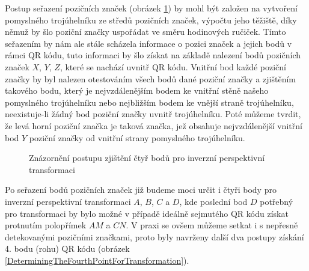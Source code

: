 Postup seřazení pozičních značek (obrázek \ref{QRCodeArea}) by mohl být založen
na vytvoření pomyslného trojúhelníku ze středů pozičních značek, výpočtu jeho těžiště, díky
němuž by šlo poziční značky uspořádat ve směru hodinových ručiček. Tímto
seřazením by nám ale stále scházela informace o pozici značek a jejich bodů 
v rámci QR kódu, tuto informaci by šlo získat na základě nalezení bodů
pozičních značek $X$, $Y$, $Z$, které se nachází uvnitř QR kódu. Vnitřní bod
každé poziční značky by byl nalezen otestováním všech bodů dané poziční značky a
zjištěním takového bodu, který je nejvzdálenějším bodem ke vnitřní stěně našeho
pomyslného trojúhelníku nebo nejbližším bodem ke vnější straně trojúhelníku,
neexistuje-li žádný bod poziční značky uvnitř trojúhelníku. Poté můžeme tvrdit,
že levá horní poziční značka je taková značka, jež obsahuje nejvzdálenější
vnitřní bod $Y$ poziční značky od vnitřní strany pomyslného trojúhelníku.

\begin{figure}[H]
  \begin{center}
    \caption{Znázornění postupu zjištění čtyř bodů pro inverzní perspektivní
    transformaci}
    \label{QRCodeArea}
  \end{center}
\end{figure}

Po seřazení bodů pozičních značek již budeme moci určit i čtyři body pro
inverzní perspektivní transformaci $A$, $B$, $C$ a $D$, kde poslední bod $D$
potřebný pro transformaci by bylo možné v případě ideálně sejmutého QR kódu získat protnutím
polopřímek $AM$ a $CN$. V praxi se ovšem můžeme setkat i s nepřesně detekovanými
pozičními značkami, proto byly navrženy další dva postupy získání 4. bodu (rohu)
QR kódu (obrázek \ref{DeterminingTheFourthPointForTransformation}).	

